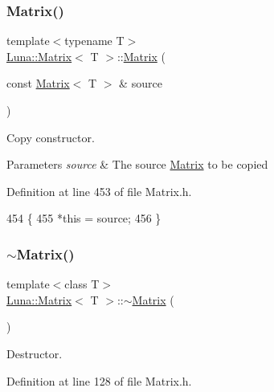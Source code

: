 \subsubsection{\texorpdfstring{Matrix()}{Matrix()}\hspace{0.1cm}{\footnotesize\ttfamily [3/3]}}
{\footnotesize\ttfamily template$<$typename T$>$ \\
\hyperlink{classLuna_1_1Matrix}{Luna\+::\+Matrix}$<$ T $>$\+::\hyperlink{classLuna_1_1Matrix}{Matrix} (\begin{DoxyParamCaption}\item[{const \hyperlink{classLuna_1_1Matrix}{Matrix}$<$ T $>$ \&}]{source }\end{DoxyParamCaption})\hspace{0.3cm}{\ttfamily [inline]}}



Copy constructor. 


\begin{DoxyParams}{Parameters}
{\em source} & The source \hyperlink{classLuna_1_1Matrix}{Matrix} to be copied \\
\hline
\end{DoxyParams}


Definition at line 453 of file Matrix.\+h.


\begin{DoxyCode}
454   \{
455     *\textcolor{keyword}{this} = source;
456   \}
\end{DoxyCode}
\mbox{\label{classLuna_1_1Matrix_a0f7b24616cfbe1bf102f2fe1b1bbc0fa}} 
\subsubsection{\texorpdfstring{$\sim$\+Matrix()}{~Matrix()}}
{\footnotesize\ttfamily template$<$class T$>$ \\
\hyperlink{classLuna_1_1Matrix}{Luna\+::\+Matrix}$<$ T $>$\+::$\sim$\hyperlink{classLuna_1_1Matrix}{Matrix} (\begin{DoxyParamCaption}{ }\end{DoxyParamCaption})\hspace{0.3cm}{\ttfamily [inline]}}



Destructor. 



Definition at line 128 of file Matrix.\+h.


